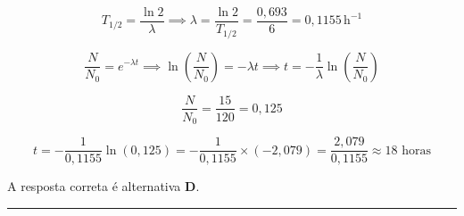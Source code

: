 \begin{flushleft}
\[
T_{1/2} = \frac{\ln 2}{\lambda} \implies \lambda = \frac{\ln 2}{T_{1/2}} = \frac{0{,}693}{6} = 0{,}1155\,\mathrm{h}^{-1}
\]

\vspace{0.3cm}


\[
\frac{N}{N_0} = e^{-\lambda t} \implies \ln\left(\frac{N}{N_0}\right) = -\lambda t \implies t = -\frac{1}{\lambda} \ln\left(\frac{N}{N_0}\right)
\]

\vspace{0.3cm}


\[
\frac{N}{N_0} = \frac{15}{120} = 0{,}125
\]

\[
t = -\frac{1}{0{,}1155} \ln(0{,}125) = -\frac{1}{0{,}1155} \times (-2{,}079) = \frac{2{,}079}{0{,}1155} \approx 18 \text{ horas}
\]

\vspace{0.3cm}


A resposta correta é alternativa \colorbox{green!50}{\textbf{D}}.
\end{flushleft}

\noindent\rule{\linewidth}{0.6pt}\\

